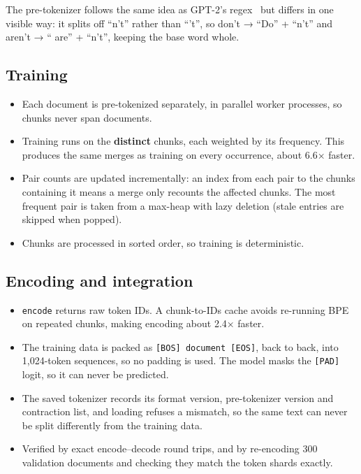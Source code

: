 \documentclass[11pt]{article}
\begin{document}
The pre-tokenizer follows the same idea as GPT-2's regex~\citep{radford2019gpt2} but differs in one visible way: it splits off ``n't'' rather than ``'t'', so don't → ``Do'' + ``n't'' and aren't → `` are'' + ``n't'', keeping the base word whole.

\subsection{Training}

\begin{itemize}
\item Each document is pre-tokenized separately, in parallel worker processes, so chunks never span documents.
\item Training runs on the \textbf{distinct} chunks, each weighted by its frequency. This produces the same merges as training on every occurrence, about 6.6× faster.
\item Pair counts are updated incrementally: an index from each pair to the chunks containing it means a merge only recounts the affected chunks. The most frequent pair is taken from a max-heap with lazy deletion (stale entries are skipped when popped).
\item Chunks are processed in sorted order, so training is deterministic.
\end{itemize}

\subsection{Encoding and integration}

\begin{itemize}
\item \texttt{encode} returns raw token IDs. A chunk-to-IDs cache avoids re-running BPE on repeated chunks, making encoding about 2.4× faster.
\item The training data is packed as \texttt{[BOS] document [EOS]}, back to back, into 1,024-token sequences, so no padding is used. The model masks the \texttt{[PAD]} logit, so it can never be predicted.
\item The saved tokenizer records its format version, pre-tokenizer version and contraction list, and loading refuses a mismatch, so the same text can never be split differently from the training data.
\item Verified by exact encode–decode round trips, and by re-encoding 300 validation documents and checking they match the token shards exactly.
\end{itemize}
\end{document}
